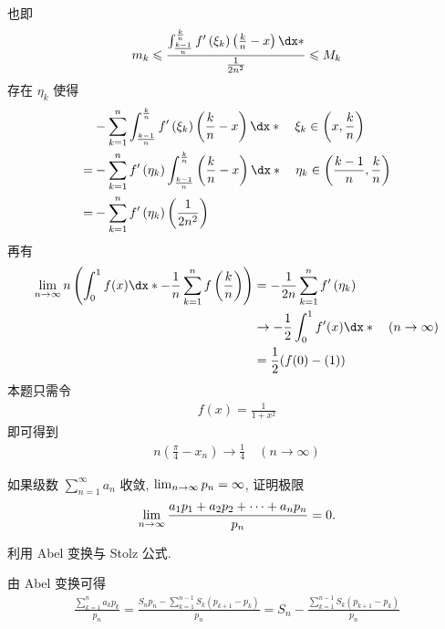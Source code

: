 \begin{exercise}[series=exer]
\begin{answer}
\begin{align*}
  \end{align*}
  也即
  \begin{align*}
    m_k \le \frac{\int_{\frac{k-1}{n}}^{\frac{k}{n}} f^{\prime}\left(\xi_{k}\right)\left(\frac{k}{n}-x\right) \dx*}{\frac{1}{2n^2}} \le M_k
  \end{align*}
  存在 $\eta_k$ 使得 
  \begin{align*}
    &-\sum_{k=1}^{n} \int_{\frac{k-1}{n}}^{\frac{k}{n}} f^{\prime}\left(\xi_{k}\right)\left(\frac{k}{n}-x\right) \dx* \quad \xi_{k} \in\left(x, \frac{k}{n}\right) \\
    =&-\sum_{k=1}^{n} f^{\prime}\left(\eta_{k}\right) \int_{\frac{k-1}{n}}^{\frac{k}{n}}\left(\frac{k}{n}-x\right) \dx* \quad \eta_{k} \in\left(\frac{k-1}{n}, \frac{k}{n}\right) \\
    =&-\sum_{k=1}^{n} f^{\prime}\left(\eta_{k}\right)\left(\frac{1}{2 n^{2}}\right)
  \end{align*}
  再有
  \begin{align*}
    \limit{n}{\infty} n\left(\int_{0}^{1} f(x) \dx*-\frac{1}{n} \sum_{k=1}^{n} f\left(\frac{k}{n}\right)\right) 
    &=-\frac{1}{2 n} \sum_{k=1}^{n} f^{\prime}\left(\eta_{k}\right) \\
    & \rightarrow-\frac{1}{2} \int_{0}^{1} f^{\prime}(x) \dx* \quad(n \rightarrow \infty) \\
    &=\frac{1}{2}(f(0)-(1))
  \end{align*}
  本题只需令
  \begin{align*}
    f(x)=\frac{1}{1+x^{2}}
  \end{align*}
  即可得到
  \begin{align*}
    n\left(\frac{\pi}{4}-x_{n}\right) \to \frac{1}{4} \quad(n \to \infty)
  \end{align*}
  \end{answer}
  \item 如果级数 $ \sum_{n = 1}^{\infty} a_{n} $ 收敛, $ \lim_{n \to \infty} p_{n} = \infty $, 证明极限
  \begin{align*}
      \lim_{n \to \infty}\frac{a_{1} p_{1} + a_{2} p_{2} + \dots + a_{n} p_{n}}{p_{n}} = 0.
  \end{align*}
  \begin{hint}
      利用 Abel 变换与 Stolz 公式.
  \end{hint}
  \begin{answer}
      由 Abel 变换可得
      \begin{align*}
          \frac{\sum_{k = 1}^{n} a_{k}p_{k}}{p_{n}} = \frac{S_{n}p_{n} - \sum_{k = 1}^{n - 1}S_{k}(p_{k + 1} - p_{k})}{p_{n}} = S_{n} - \frac{\sum_{k = 1}^{n - 1}S_{k}(p_{k + 1} - p_{k})}{p_{n}}

\end{align*}
\end{answer}
\end{exercise}

